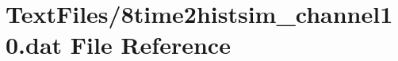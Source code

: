 \hypertarget{8time2histsim__channel10_8dat}{}\section{Text\+Files/8time2histsim\+\_\+channel10.dat File Reference}
\label{8time2histsim__channel10_8dat}
